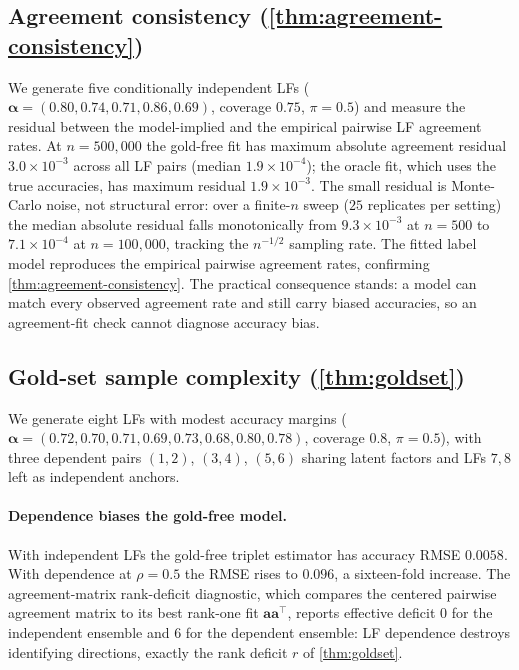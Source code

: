 \subsection{Agreement consistency (\cref{thm:agreement-consistency})}

We generate five conditionally independent LFs ($\bm{\alpha} =
(0.80, 0.74, 0.71, 0.86, 0.69)$, coverage $0.75$, $\pi = 0.5$) and
measure the residual between the model-implied and the empirical
pairwise LF agreement rates. At $n = 500{,}000$ the gold-free fit has
maximum absolute agreement residual $3.0 \times 10^{-3}$ across all
LF pairs (median $1.9 \times 10^{-4}$); the oracle fit, which uses
the true accuracies, has maximum residual $1.9 \times 10^{-3}$. The
small residual is Monte-Carlo noise, not structural error: over a
finite-$n$ sweep ($25$ replicates per setting) the median absolute
residual falls monotonically from $9.3 \times 10^{-3}$ at $n = 500$
to $7.1 \times 10^{-4}$ at $n = 100{,}000$, tracking the $n^{-1/2}$
sampling rate. The fitted label model reproduces the empirical
pairwise agreement rates, confirming \cref{thm:agreement-consistency}.
The practical consequence stands: a model can match every observed
agreement rate and still carry biased accuracies, so an agreement-fit
check cannot diagnose accuracy bias.

\subsection{Gold-set sample complexity (\cref{thm:goldset})}

We generate eight LFs with modest accuracy margins ($\bm{\alpha} =
(0.72, 0.70, 0.71, 0.69, 0.73, 0.68, 0.80, 0.78)$, coverage $0.8$,
$\pi = 0.5$), with three dependent pairs $(1,2)$, $(3,4)$, $(5,6)$
sharing latent factors and LFs $7, 8$ left as independent anchors.

\paragraph{Dependence biases the gold-free model.} With independent
LFs the gold-free triplet estimator has accuracy RMSE $0.0058$. With
dependence at $\rho = 0.5$ the RMSE rises to $0.096$, a
sixteen-fold increase. The agreement-matrix rank-deficit diagnostic,
which compares the centered pairwise agreement matrix to its
best rank-one fit $\bm{a}\bm{a}^\top$, reports effective deficit $0$
for the independent ensemble and $6$ for the dependent ensemble: LF
dependence destroys identifying directions, exactly the rank deficit
$r$ of \cref{thm:goldset}.

